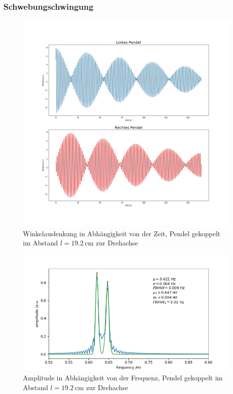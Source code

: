 \subsubsection{Schwebungschwingung}
\begin{figure}[H]
	\centering
	\includegraphics[height = 0.5 \textheight]{figures/211-17.jpeg}
	\caption{Winkelauslenkung in Abhängigkeit von der Zeit, Pendel gekoppelt im Abstand $l = \SI{19,2}{\cm}$ zur Drehachse}
\end{figure}
\begin{figure}[H]
	\centering
	\includegraphics[height = 0.25 \textheight]{figures/211-18.jpeg}
	\caption{Amplitude in Abhängigkeit von der Frequenz, Pendel gekoppelt im Abstand $l = \SI{19,2}{\cm}$ zur Drehachse}
\end{figure}

